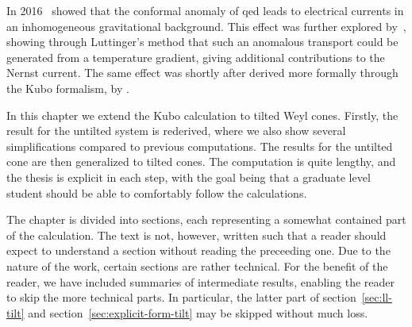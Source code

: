 In 2016~\textcite{chernodubAnomalousTransportDue2016} showed that the conformal anomaly of \gls{qed} leads to electrical currents in an inhomogeneous gravitational background.
This effect was further explored by~\textcite{chernodubGenerationNernstCurrent2018}, showing through Luttinger's method that such an anomalous transport could be generated from a temperature gradient, giving additional contributions to the Nernst current.
The same effect was shortly after derived more formally through the Kubo formalism, by \textcite{arjonaFingerprintsConformalAnomaly2019}.

In this chapter we extend the Kubo calculation to tilted Weyl cones.
Firstly, the result for the untilted system is rederived, where we also show several simplifications compared to previous computations.
The results for the untilted cone are then generalized to tilted cones.
The computation is quite lengthy, and the thesis is explicit in each step, with the goal being that a graduate level student should be able to comfortably follow the calculations.

The chapter is divided into sections, each representing a somewhat contained part of the calculation.
The text is not, however, written such that a reader should expect to understand a section without reading the preceeding one.
Due to the nature of the work, certain sections are rather technical.
For the benefit of the reader, we have included summaries of intermediate results, enabling the reader to skip the more technical parts.
In particular, the latter part of section~\ref{sec:ll-tilt} and section~\ref{sec:explicit-form-tilt} may be skipped without much loss.

